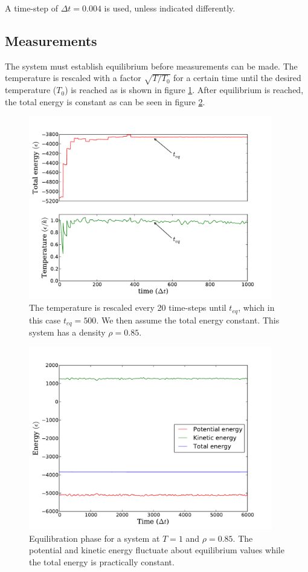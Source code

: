 \documentclass{article}
\begin{document}
A time-step of $\Delta t = 0.004$ is used, unless indicated differently.

\subsection{Measurements}
The system must establish equilibrium before measurements can be made. The temperature is rescaled with a factor $\sqrt{T/T_{0}}$ for a certain time until the desired temperature ($T_0$) is reached as is shown in figure \ref{fig:equil}. After equilibrium is reached, the total energy is constant as can be seen in figure \ref{fig:energies}. \\

\begin{figure}[!htb]
  \centering
    \includegraphics[height=80mm]{equil.pdf}
  \caption[]{The temperature is rescaled every 20 time-steps until $t_{eq}$, which in this case $t_{eq}=500$. We then assume the total energy constant. This system has a density $\rho=0.85$.}
  \label{fig:equil}
\end{figure}


\begin{figure}[!htb]
  \centering
    \includegraphics[height=80mm]{energies.pdf}
  \caption[]{Equilibration phase for a system at $T = 1$ and $\rho = 0.85$. The potential and kinetic energy fluctuate about equilibrium values while the total energy is practically constant.}
  \label{fig:energies}
\end{figure}
\end{document}

